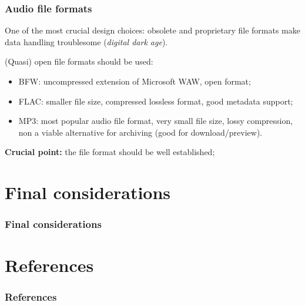 \documentclass{beamer}
\newcommand\rb[1]{\textcolor{ThemeRed}{\textbf{#1}}}
\begin{document}
  \begin{frame}
    \frametitle{Audio file formats}
    
    One of the most crucial design choices: obsolete and proprietary file formats make data handling troublesome (\textit{digital dark age}).

    \vspace{1em}

    (Quasi) open file formats should be used:

    \vspace{0.5em}

    \begin{itemize}
      \itemsep0.5em
      \item BFW: uncompressed extension of Microsoft WAW, open format;
      \item FLAC: smaller file size, compressed lossless format, good metadata support;
      \item MP3: most popular audio file format, very small file size, lossy compression, non a viable alternative for archiving (good for download/preview).
    \end{itemize}

    \vspace{1em}

    \rb{Crucial point:} the file format should be well established;

  \end{frame}

  

\section{Final considerations}

  \begin{frame}
    \frametitle{Final considerations}
  \end{frame}



\backupbegin

\section{References}

  \begin{frame}
    \frametitle{References}
  \end{frame}

\backupend
\end{document}
